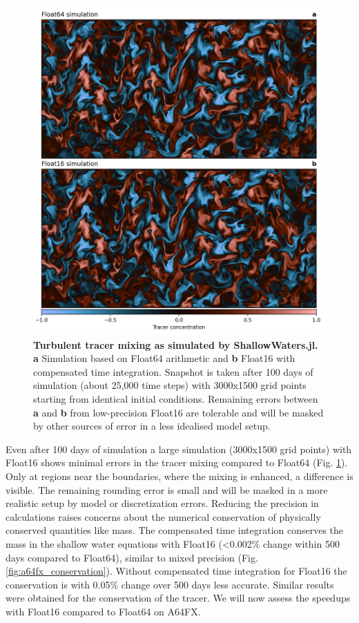 \begin{figure}[tbhp]
	\includegraphics[width=1\textwidth]{Figures/a64fx/frame_hr_0199.png}
	\caption{\textbf{Turbulent tracer mixing as simulated by ShallowWaters.jl. a}
	Simulation based on Float64 arithmetic and \textbf{b} Float16 with compensated time integration.
	Snapshot is taken after 100 days of simulation (about 25,000 time steps) with 3000x1500 grid points
	starting from identical initial conditions. Remaining errors between \textbf{a} and \textbf{b} from
	low-precision Float16 are tolerable and will be masked by other sources of error in a less
	idealised model setup.}
	\label{fig:a64fx_tracermixing}
\end{figure}

Even after 100 days of simulation a large simulation (3000x1500 grid points) with Float16 shows minimal errors in
the tracer mixing compared to Float64 (Fig. \ref{fig:a64fx_tracermixing}). Only at regions near the boundaries,
where the mixing is enhanced, a difference is visible. The remaining rounding error is small and will be masked
in a more realistic setup by model or discretization errors. Reducing the precision in calculations raises concerns
about the numerical conservation of physically conserved quantities like mass. The compensated time integration
conserves the mass in the shallow water equations with Float16 (<0.002\% change within 500 days compared to Float64),
similar to mixed precision (Fig. \ref{fig:a64fx_conservation}). Without compensated time integration for Float16 the conservation is with
0.05\% change over 500 days less accurate. Similar results were obtained for the conservation of the tracer.
We will now assess the speedups with Float16 compared to Float64 on A64FX.

